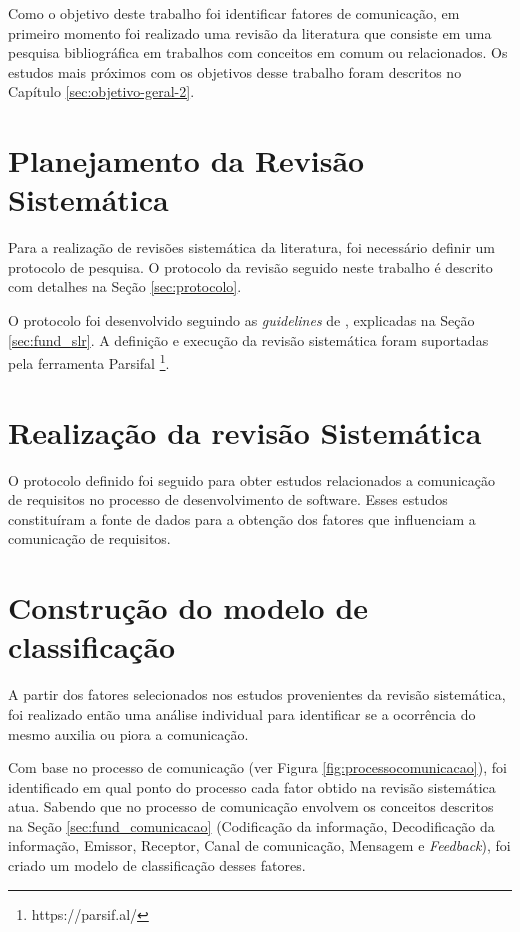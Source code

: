     Como o objetivo deste trabalho foi identificar fatores de comunicação, em primeiro momento foi realizado uma revisão da literatura que consiste em uma pesquisa bibliográfica em trabalhos com conceitos em comum ou relacionados. Os estudos mais próximos com os objetivos desse trabalho foram descritos no Capítulo \ref{sec:objetivo-geral-2}. %
     
\section{Planejamento da Revisão Sistemática}

    Para a realização de revisões sistemática da literatura, foi necessário definir um protocolo de pesquisa. O protocolo da revisão seguido neste trabalho é descrito com detalhes na Seção \ref{sec:protocolo}.
    
    O protocolo foi desenvolvido seguindo as \emph{guidelines} de \cite{kitchenham}, explicadas na Seção \ref{sec:fund_slr}. A definição e execução da revisão sistemática foram suportadas pela ferramenta Parsifal \footnote{https://parsif.al/}. 
     
 \section{Realização da revisão Sistemática}  
 O protocolo definido foi seguido para obter estudos relacionados a comunicação de requisitos no processo de desenvolvimento de software. Esses estudos constituíram a fonte de dados para a obtenção dos fatores que influenciam a comunicação de requisitos.
 
    

\section{Construção do modelo de classificação}

A partir dos fatores selecionados nos estudos provenientes da revisão sistemática, foi realizado então uma análise individual para identificar se a ocorrência do mesmo auxilia ou piora a comunicação. 

Com base no processo de comunicação (ver Figura \ref{fig:processocomunicacao}), foi identificado em qual ponto do processo cada fator obtido na revisão sistemática atua. Sabendo que no processo de comunicação envolvem os conceitos descritos na Seção \ref{sec:fund_comunicacao} (Codificação da informação, Decodificação da informação, Emissor, Receptor, Canal de comunicação, Mensagem e \emph{Feedback}), foi criado um modelo de classificação desses fatores. %

